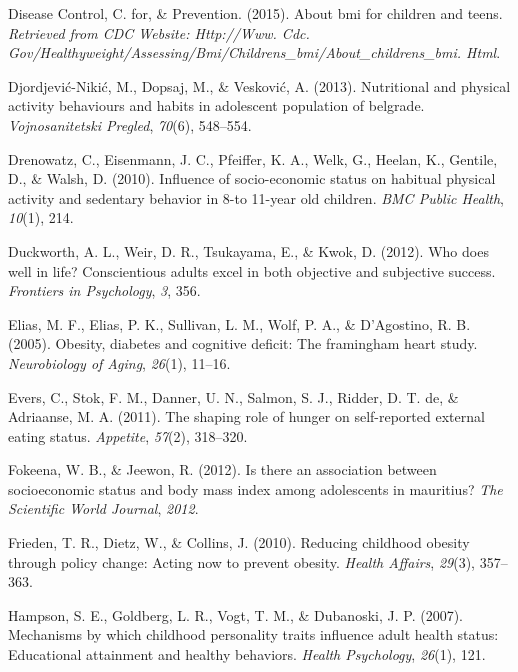 \documentclass[man]{apa6}
\begin{document}
\leavevmode\hypertarget{ref-centers2015bmi}{}%
Disease Control, C. for, \& Prevention. (2015). About bmi for children and teens. \emph{Retrieved from CDC Website: Http://Www. Cdc. Gov/Healthyweight/Assessing/Bmi/Childrens\_bmi/About\_childrens\_bmi. Html}.

\leavevmode\hypertarget{ref-djordjevic2013nutritional}{}%
Djordjević-Nikić, M., Dopsaj, M., \& Vesković, A. (2013). Nutritional and physical activity behaviours and habits in adolescent population of belgrade. \emph{Vojnosanitetski Pregled}, \emph{70}(6), 548--554.

\leavevmode\hypertarget{ref-drenowatz2010influence}{}%
Drenowatz, C., Eisenmann, J. C., Pfeiffer, K. A., Welk, G., Heelan, K., Gentile, D., \& Walsh, D. (2010). Influence of socio-economic status on habitual physical activity and sedentary behavior in 8-to 11-year old children. \emph{BMC Public Health}, \emph{10}(1), 214.

\leavevmode\hypertarget{ref-duckworth2012does}{}%
Duckworth, A. L., Weir, D. R., Tsukayama, E., \& Kwok, D. (2012). Who does well in life? Conscientious adults excel in both objective and subjective success. \emph{Frontiers in Psychology}, \emph{3}, 356.

\leavevmode\hypertarget{ref-elias2005obesity}{}%
Elias, M. F., Elias, P. K., Sullivan, L. M., Wolf, P. A., \& D'Agostino, R. B. (2005). Obesity, diabetes and cognitive deficit: The framingham heart study. \emph{Neurobiology of Aging}, \emph{26}(1), 11--16.

\leavevmode\hypertarget{ref-evers2011shaping}{}%
Evers, C., Stok, F. M., Danner, U. N., Salmon, S. J., Ridder, D. T. de, \& Adriaanse, M. A. (2011). The shaping role of hunger on self-reported external eating status. \emph{Appetite}, \emph{57}(2), 318--320.

\leavevmode\hypertarget{ref-fokeena2012there}{}%
Fokeena, W. B., \& Jeewon, R. (2012). Is there an association between socioeconomic status and body mass index among adolescents in mauritius? \emph{The Scientific World Journal}, \emph{2012}.

\leavevmode\hypertarget{ref-frieden2010reducing}{}%
Frieden, T. R., Dietz, W., \& Collins, J. (2010). Reducing childhood obesity through policy change: Acting now to prevent obesity. \emph{Health Affairs}, \emph{29}(3), 357--363.

\leavevmode\hypertarget{ref-hampson2007mechanisms}{}%
Hampson, S. E., Goldberg, L. R., Vogt, T. M., \& Dubanoski, J. P. (2007). Mechanisms by which childhood personality traits influence adult health status: Educational attainment and healthy behaviors. \emph{Health Psychology}, \emph{26}(1), 121.
\end{document}
